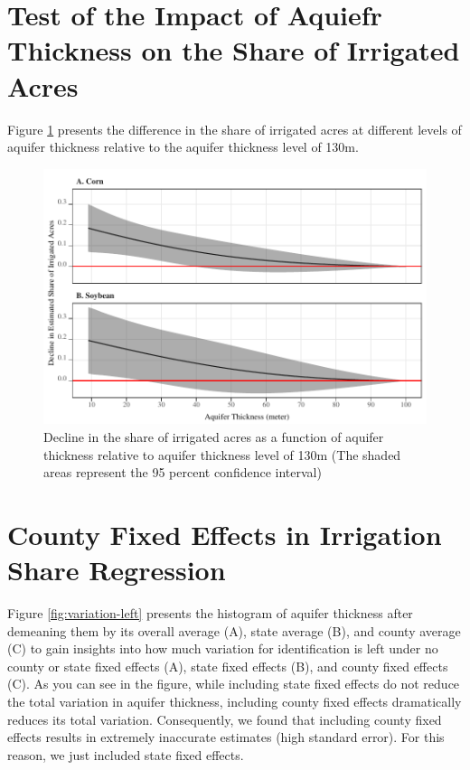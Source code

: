 \documentclass[
]{article}
\begin{document}
\clearpage

\hypertarget{test-dif-share}{%
\section{Test of the Impact of Aquiefr Thickness on the Share of Irrigated Acres}\label{test-dif-share}}

\setcounter{figure}{0}
\renewcommand{\thefigure}{C.\arabic{figure}}

Figure \ref{fig:test-sat-share} presents the difference in the share of irrigated acres at different levels of aquifer thickness relative to the aquifer thickness level of 130m.

\begin{figure}[H]

{\centering \includegraphics[width=6.5in,]{Figures/g_share_dif} 

}

\caption{Decline in the share of irrigated acres as a function of aquifer thickness relative to aquifer thickness level of 130m (The shaded areas represent the 95 percent confidence interval)}\label{fig:test-sat-share}
\end{figure}

\hypertarget{county-fe}{%
\section{County Fixed Effects in Irrigation Share Regression}\label{county-fe}}

\setcounter{figure}{0}
\renewcommand{\thefigure}{B.\arabic{figure}}

Figure \ref{fig:variation-left} presents the histogram of aquifer thickness after demeaning them by its overall average (A), state average (B), and county average (C) to gain insights into how much variation for identification is left under no county or state fixed effects (A), state fixed effects (B), and county fixed effects (C). As you can see in the figure, while including state fixed effects do not reduce the total variation in aquifer thickness, including county fixed effects dramatically reduces its total variation. Consequently, we found that including county fixed effects results in extremely inaccurate estimates (high standard error). For this reason, we just included state fixed effects.
\end{document}
